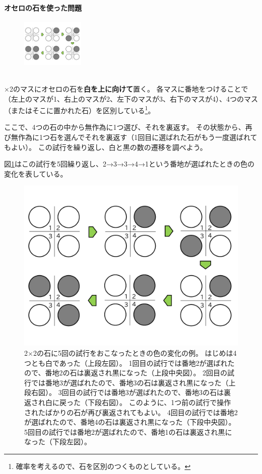 \documentclass[luatexja,fontsize=12pt]{jlreq}\usepackage{ifthen}\newcounter{enlarge}\setcounter{enlarge}{1}
\begin{document}
\paragraph{オセロの石を使った問題}
\begin{figure}
\vspace*{-\intextsep}
\includegraphics[width=3cm]{f1.pdf}
\end{figure}%
\mbox{}\\
×2のマスにオセロの石を\textbf{白を上に向けて}置く。
各マスに番地をつけることで（左上のマスが1、右上のマスが2、左下のマスが3、右下のマスが4）、4つのマス（またはそこに置かれた石）を区別している\footnote{%
確率を考えるので、石を区別のつくものとしている。
}。

ここで、4つの石の中から無作為に1つ選び、それを裏返す。
その状態から、再び無作為に1つ石を選んでそれを裏返す（1回目に選ばれた石がもう一度選ばれてもよい）。
この試行を繰り返し、白と黒の数の遷移を調べよう。

図\ref{f:2}はこの試行を5回繰り返し、2→3→3→4→1という番地が選ばれたときの色の変化を表している。
\begin{figure}[] 
\centering 
\includegraphics[width=10truecm]{f2.pdf}
\captionsetup{width=.9\linewidth}
\caption{%
2×2の石に5回の試行をおこなったときの色の変化の例。
はじめは4つとも白であった（上段左図）。
1回目の試行では番地2が選ばれたので、番地2の石は裏返され黒になった（上段中央図）。
2回目の試行では番地3が選ばれたので、番地3の石は裏返され黒になった（上段右図）。
3回目の試行では番地3が選ばれたので、番地3の石は裏返され白に戻った（下段右図）。
このように、1つ前の試行で操作されたばかりの石が再び裏返されてもよい。
4回目の試行では番地2が選ばれたので、番地4の石は裏返され黒になった（下段中央図）。
5回目の試行では番地2が選ばれたので、番地1の石は裏返され黒になった（下段左図）。
}
\label{f:2}
\end{figure}%
\end{document}
